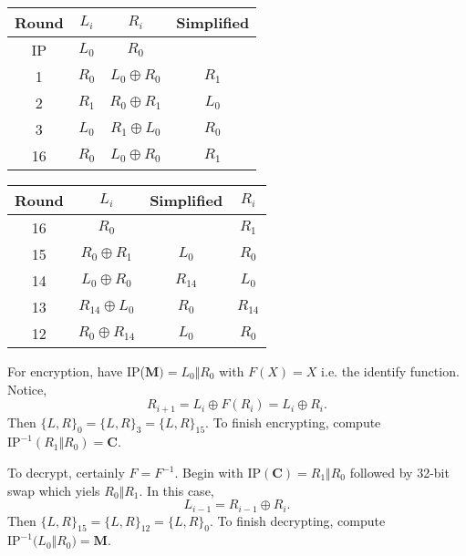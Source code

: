 \documentclass[../hw_sols.tex]{subfiles}
\begin{document}
\begin{description}
\begin{solution}
\begin{multicols}{2}
	\begin{center}
	\begin{tabular}{ c | c | c | c }
		\textbf{Round} & $L_i$ & $R_i$ & Simplified \\[2pt]   %
		\hline
		IP & $L_0$ & $R_0$ \\[5pt]
		 1 & $R_0$ & $L_0 \oplus R_0$ & $R_1$ \\[5pt]
		 2 & $R_1$ & $R_0 \oplus R_1$ & $L_0$ \\[5pt]
		 3 & $L_0$ & $R_1 \oplus L_0$ & $R_0$ \\[5pt]
		16 & $R_0$ & $L_0 \oplus R_0$ & $R_1$
	\end{tabular}
	\end{center}

	\begin{center}
	\begin{tabular}{ c | c | c | c }
		\textbf{Round} & $L_i$ & Simplified & $R_i$ \\[2pt]   %
		\hline
		16 &               $R_0$ &          & $R_1$    \\[5pt]
		15 &    $R_0 \oplus R_1$ &    $L_0$ & $R_0$    \\[5pt]
		14 &    $L_0 \oplus R_0$ & $R_{14}$ & $L_0$    \\[5pt]
		13 & $R_{14} \oplus L_0$ &    $R_0$ & $R_{14}$ \\[5pt]
		12 & $R_0 \oplus R_{14}$ &    $L_0$ & $R_0$
	\end{tabular}
	\end{center}
\end{multicols}

For encryption, have IP($\mathbf{M}) = L_0 \Vert R_0$ with $F(X) = X$ i.e. the 
identify function. Notice,
	$$R_{i+1} = L_i \oplus F(R_i) = L_i \oplus R_i.$$
Then $\{L,R\}_0 = \{L,R\}_3 = \{L,R\}_{15}$. To finish encrypting, compute
$\text{IP}^{-1}(R_1 \Vert R_0) = \mathbf{C}$.

To decrypt, certainly $F = F^{-1}$. Begin with 
$\text{IP}(\mathbf{C}) = R_1 \Vert R_0$ followed by 32-bit swap which yiels 
$R_0 \Vert R_1$. In this case,
	$$L_{i-1} = R_{i-1} \oplus R_i.$$
Then $\{L,R\}_{15} = \{L,R\}_{12} = \{L,R\}_{0}$. To finish decrypting, compute
$\text{IP}^{-1}\big( L_0 \Vert R_0 \big) = \textbf{M}$.

\end{solution}

\end{description}
\end{document}
